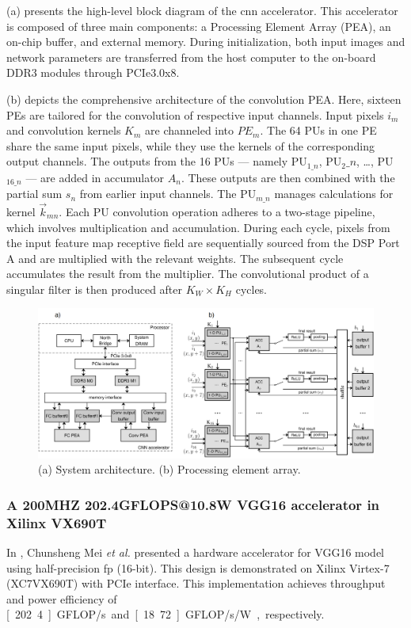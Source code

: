 (a) presents the high-level block diagram of the \gls{cnn} accelerator. This accelerator is composed of three main components: a Processing Element Array (PEA), an on-chip buffer, and external memory. During initialization, both input images and network parameters are transferred from the host computer to the on-board DDR3 modules through PCIe3.0x8.

(b) depicts the comprehensive architecture of the convolution PEA. Here, sixteen PEs are tailored for the convolution of respective input channels. Input pixels \(i_m\) and convolution kernels \(K_m\) are channeled into \(PE_m\). The 64 PUs in one PE share the same input pixels, while they use the kernels of the corresponding output channels. The outputs from the 16 PUs --- namely PU\(_{1\_n}\), PU\(_2\_n\), \ldots, PU\(_{16\_n}\) --- are added in accumulator \(A_n\). These outputs are then combined with the partial sum \(s_n\) from earlier input channels. The PU\(_{m\_n}\) manages calculations for kernel \(\vec{k}_{mn}\). Each PU convolution operation adheres to a two-stage pipeline, which involves multiplication and accumulation. During each cycle, pixels from the input feature map receptive field are sequentially sourced from the DSP Port A and are multiplied with the relevant weights. The subsequent cycle accumulates the result from the multiplier. The convolutional product of a singular filter is then produced after \(K_W \times K_H\) cycles.


\begin{figure}[h!]
	\centering
	\includegraphics[width=\textwidth]{./figures/3_g.png}
	\caption{(a) System architecture. (b) Processing element array.}
	\label{fig:lian2019high}
\end{figure}
\FloatBarrier

\subsubsection{A 200MHZ 202.4GFLOPS@10.8W VGG16 accelerator in Xilinx VX690T}
In \cite{mei2017200mhz}, Chunsheng Mei \textit{et al.} presented a hardware accelerator for VGG16 model using half-precision \gls{fp} (16-bit). This design is demonstrated on Xilinx Virtex-7 (XC7VX690T) with PCIe interface. This implementation achieves throughput and power efficiency of \unit[202.4]{GFLOP/s} and \unit[18.72]{GFLOP/s/W}, respectively.

